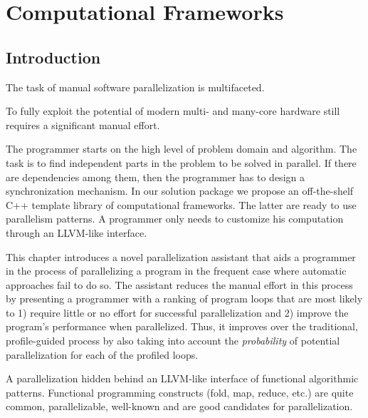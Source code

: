 \chapter{Computational Frameworks}
\label{frameworks}

\section{Introduction}
\label{frameworks_introduction}





\quad The task of manual software parallelization is multifaceted. 

To fully exploit the potential of modern multi- and many-core hardware still requires a significant manual effort.


\quad The programmer starts on the high level of problem domain and algorithm. The task is to find independent parts in the problem to be solved in parallel. If there are dependencies among them, then the programmer has to design a synchronization mechanism. In our solution package we propose an off-the-shelf C++ template library of computational frameworks. The latter are ready to use parallelism patterns. A programmer only needs to customize his computation through an LLVM-like interface.

This chapter introduces a novel parallelization assistant that aids a programmer in the process of parallelizing a program in the frequent case where automatic approaches fail to do so.
%
The assistant reduces the manual effort in this process by presenting a programmer with a ranking of program loops that are most likely to 1) require little or no effort for successful parallelization and 2) improve the program's performance when parallelized.
%
Thus, it improves over the traditional, profile-guided process by also taking into account the \emph{probability} of potential parallelization for each of the profiled loops.


A parallelization hidden behind an LLVM-like interface of functional algorithmic patterns. 
%
Functional programming constructs (fold, map, reduce, etc.) are quite common, parallelizable, well-known and are good candidates for parallelization.

